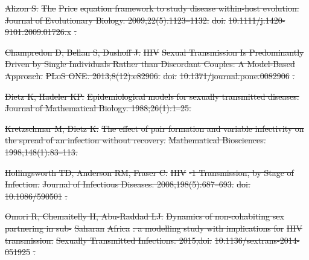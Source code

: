 \documentclass[10pt,letterpaper]{article}
\providecommand{\DIFdeltex}[1]{{\protect\color{red}\sout{#1}}}                      %
\providecommand{\DIFdel}[1]{\texorpdfstring{\DIFdeltex{#1}}{}} %
\begin{document}
\DIFdel{Alizon S.
}%
\DIFdel{The }%
\DIFdel{Price}%
\DIFdel{equation framework to study disease within-host
  evolution.
}%
\DIFdel{Journal of Evolutionary Biology. 2009;22(5):1123--1132.
}%
\DIFdel{doi:}%
\DIFdel{10.1111/j.1420-9101.2009.01726.x}%
\DIFdel{.
}%

\DIFdel{Champredon D, Bellan S, Dushoff J.
}%
\DIFdel{HIV}%
\DIFdel{Sexual Transmission Is Predominantly Driven by Single
  Individuals Rather than Discordant Couples: A Model-Based Approach.
}%
\DIFdel{PLoS ONE. 2013;8(12):e82906.
}%
\DIFdel{doi:}%
\DIFdel{10.1371/journal.pone.0082906}%
\DIFdel{.
}%

\DIFdel{Dietz K, Hadeler KP.
}%
\DIFdel{Epidemiological models for sexually transmitted diseases.
}%
\DIFdel{Journal of Mathematical Biology. 1988;26(1):1--25.
}%

\DIFdel{Kretzschmar M, Dietz K.
}%
\DIFdel{The effect of pair formation and variable infectivity on the spread
  of an infection without recovery.
}%
\DIFdel{Mathematical Biosciences. 1998;148(1):83--113.
}%

\DIFdel{Hollingsworth TD, Anderson RM, Fraser C.
}%
\DIFdel{HIV}%
\DIFdel{-1 Transmission, by Stage of Infection.
}%
\DIFdel{Journal of Infectious Diseases. 2008;198(5):687--693.
}%
\DIFdel{doi:}%
\DIFdel{10.1086/590501}%
\DIFdel{.
}%

\DIFdel{Omori R, Chemaitelly H, Abu-Raddad LJ.
}%
\DIFdel{Dynamics of non-cohabiting sex partnering in sub-}%
\DIFdel{Saharan}%
\DIFdel{Africa}%
\DIFdel{:
  a modelling study with implications for }%
\DIFdel{HIV}%
\DIFdel{transmission.
}%
\DIFdel{Sexually Transmitted Infections.
  2015;doi:}%
\DIFdel{10.1136/sextrans-2014-051925}%
\DIFdel{.
}%
\end{document}
